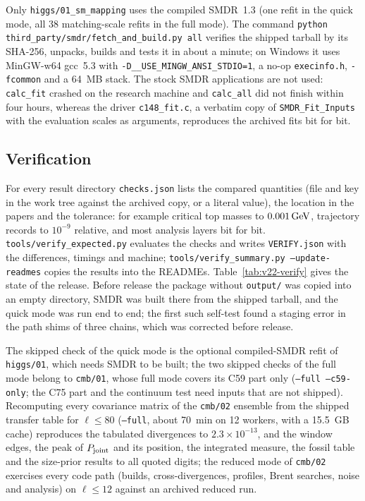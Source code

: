 Only \texttt{higgs/01\_sm\_mapping} uses the compiled SMDR~1.3 (one refit in the quick mode, all 38 matching-scale refits in the full mode).
The command \texttt{python third\_party/\allowbreak smdr/\allowbreak fetch\_and\_build.py all} verifies the shipped tarball by its SHA-256, unpacks, builds and tests it in about a minute; on Windows it uses MinGW-w64 gcc~5.3 with \texttt{-D\_\_USE\_MINGW\_ANSI\_STDIO=1}, a no-op \texttt{execinfo.h}, \texttt{-fcommon} and a 64~MB stack.
The stock SMDR applications are not used: \texttt{calc\_fit} crashed on the research machine and \texttt{calc\_all} did not finish within four hours, whereas the driver \texttt{c148\_fit.c}, a verbatim copy of \texttt{SMDR\_Fit\_Inputs} with the evaluation scales as arguments, reproduces the archived fits bit for bit.

\subsection{Verification}\label{sec:v22-verify}

For every result directory \texttt{checks.json} lists the compared quantities (file and key in the work tree against the archived copy, or a literal value), the location in the papers and the tolerance: for example critical top masses to $0.001\,\mathrm{GeV}$, trajectory records to $10^{-9}$ relative, and most analysis layers bit for bit.
\texttt{tools/verify\_expected.py} evaluates the checks and writes \texttt{VERIFY.json} with the differences, timings and machine; \texttt{tools/verify\_summary.py --update-readmes} copies the results into the READMEs.
Table~\ref{tab:v22-verify} gives the state of the release.
Before release the package without \texttt{output/} was copied into an empty directory, SMDR was built there from the shipped tarball, and the quick mode was run end to end; the first such self-test found a staging error in the path shims of three chains, which was corrected before release.



The skipped check of the quick mode is the optional compiled-SMDR refit of \texttt{higgs/01}, which needs SMDR to be built; the two skipped checks of the full mode belong to \texttt{cmb/01}, whose full mode covers its C59 part only (\texttt{--full --c59-only}; the C75 part and the continuum test need inputs that are not shipped). %
Recomputing every covariance matrix of the \texttt{cmb/02} ensemble from the shipped transfer table for $\ell\le80$ (\texttt{--full}, about 70~min on 12 workers, with a 15.5~GB cache) reproduces the tabulated divergences to $2.3\times10^{-13}$, and the window edges, the peak of $P_{\rm joint}$ and its position, the integrated measure, the fossil table and the size-prior results to all quoted digits; the reduced mode of \texttt{cmb/02} exercises every code path (builds, cross-divergences, profiles, Brent searches, noise and analysis) on $\ell\le12$ against an archived reduced run. %

